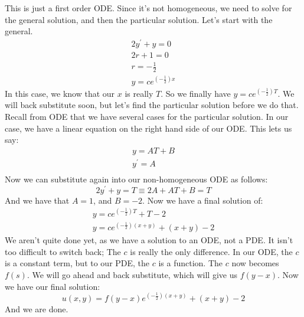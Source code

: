 \noindent This is just a first order ODE. Since it's not homogeneous, we need to
solve for the general solution, and then the particular solution. Let's start
with the general.
\begin{gather*}
2y^{'} + y = 0\\
2r + 1 = 0\\
r = -\frac{1}{2}\\
y = ce^{\left(-\frac{1}{2}\right)x}
\end{gather*}
\noindent In this case, we know that our $x$ is really $T$. So we finally have
$y = ce^{\left(-\frac{1}{2}\right)T}$. We will back substitute soon, but let's
find the particular solution before we do that.
\noindent Recall from ODE that we have several cases for the particular
solution. In our case, we have a linear equation on the right hand side of our
ODE. This lets us say:
\begin{gather*}
y = AT + B\\
y^{'} = A\\
\end{gather*}
\noindent Now we can substitute again into our non-homogeneous ODE as follows:
\[
2y^{'} + y = T \equiv 2A + AT + B = T
\]
\noindent And we have that $A = 1$, and $B = -2$. Now we have a final solution of:
\begin{gather*}
y = ce^{\left(-\frac{1}{2}\right)T} + T - 2\\
y = ce^{\left(-\frac{1}{2}\right)(x+y)} + (x + y) - 2
\end{gather*}
\noindent We aren't quite done yet, as we have a solution to an ODE, not a PDE.
It isn't too difficult to switch back; The $c$ is really the only difference. In
our ODE, the $c$ is a constant term, but to our PDE, the $c$ is a function. The
$c$ now becomes $f(s)$. We will go ahead and back substitute, which will give us
$f(y-x)$. Now we have our final solution:
\[
u(x,y) = f(y-x)e^{\left(-\frac{1}{2}\right)(x+y)} + (x + y) - 2
\]
\noindent And we are done.
